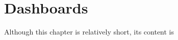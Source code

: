 \section{Dashboards}
\label{sec:dashboards}

Although this chapter is relatively short, its content is 